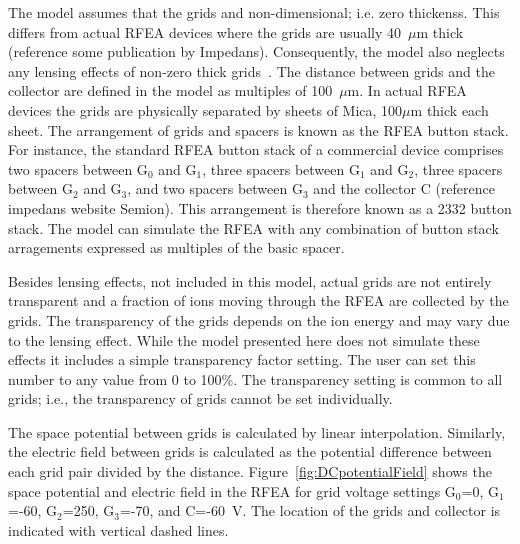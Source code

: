 The model assumes that the grids and non-dimensional; i.e. zero thickenss. This differs from actual RFEA devices where the grids are usually 40~$\mu$m thick (reference some publication by Impedans). Consequently, the model also neglects any lensing effects of non-zero thick grids~\cite{vandeVen2018,Buiter2018}. The distance between grids and the collector are defined in the model as multiples of 100~$\mu$m. In actual RFEA devices the grids are physically separated by sheets of Mica, 100$\mu$m thick each sheet. The arrangement of grids and spacers is known as the RFEA button stack. For instance, the standard RFEA button stack of a commercial device comprises two spacers between G$_0$ and G$_1$, three spacers between G$_1$ and G$_2$, three spacers between G$_2$ and G$_3$, and two spacers between G$_3$ and the collector C (reference impedans website Semion). This arrangement is therefore known as a 2332 button stack. The model can simulate the RFEA with any combination of button stack arragements expressed as multiples of the basic spacer. 

Besides lensing effects, not included in this model, actual grids are not entirely transparent and a fraction of ions moving through the RFEA are collected by the grids. The transparency of the grids depends on the ion energy and may vary due to the lensing effect. While the model presented here does not simulate these effects it includes a simple transparency factor setting. The user can set this number to any value from 0 to 100\%. The transparency setting is common to all grids; i.e., the transparency of grids cannot be set individually.     

The space potential between grids is calculated by linear interpolation. Similarly, the electric field between grids is calculated as the potential difference between each grid pair divided by the distance. Figure~\ref{fig:DCpotentialField} shows the space potential and electric field in the RFEA for grid voltage settings G$_0$=0, G$_1$=-60, G$_2$=250, G$_3$=-70, and C=-60~V. The location of the grids and collector is indicated with vertical dashed lines. 


